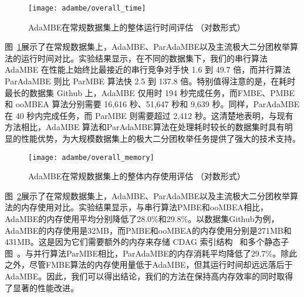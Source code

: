


\begin{figure} [H]
	\centering
  \vspace{0.05in}
	\texttt{[image: adambe/overall\_time]}
	\caption{AdaMBE在常规数据集上的整体运行时间评估 （对数形式）}

	\label{fig:ada_overall_time}
\end{figure}




图~\ref{fig:ada_overall_time}展示了在常规数据集上，AdaMBE、ParAdaMBE以及主流极大二分团枚举算法的运行时间对比。实验结果显示，在不同的数据集下，我们的串行算法 AdaMBE 在性能上始终比最接近的串行竞争对手快 1.6 到 49.7 倍，而并行算法 ParAdaMBE 则比 ParMBE 算法快 2.5 到 137.8 倍。特别值得注意的是，在耗时最长的数据集 Github 上，AdaMBE 仅用时 194 秒完成任务，而FMBE、PMBE 和 ooMBEA 算法分别需要 16,616 秒、51,647 秒和 9,639 秒。同样，ParAdaMBE 在 40 秒内完成任务，而 ParMBE 则需要超过 2,412 秒。这清楚地表明，与现有方法相比，AdaMBE 算法和ParAdaMBE算法在处理耗时较长的数据集时具有明显的性能优势，为大规模数据集上的极大二分团枚举任务提供了强大的技术支持。

\begin{figure} [H]
	\centering
   \vspace{0.05in}
	\texttt{[image: adambe/overall\_memory]}
	\caption{AdaMBE在常规数据集上的整体内存使用评估 （对数形式）}

	\label{fig:ada_overall_memory}
\end{figure}

图~\ref{fig:ada_overall_memory}展示了在常规数据集上，AdaMBE、ParAdaMBE以及主流极大二分团枚举算法的内存使用对比。实验结果显示，与串行算法PMBE和ooMBEA相比，AdaMBE的内存使用平均分别降低了28.0\%和29.8\%。以数据集Github为例，AdaMBE的内存使用是32MB，而PMBE和ooMBEA的内存使用分别是271MB和431MB。这是因为它们需要额外的内存来存储 CDAG 索引结构~\cite{PMBE20} 和多个静态子图~\cite{ooMBE22}。与并行算法ParMBE相比，ParAdaMBE的内存消耗平均降低了29.7\%。除此之外，尽管FMBE算法的内存使用量低于AdaMBE，但其运行时间却远远落后于AdaMBE。因此，我们可以得出结论，我们的方法在保持高内存效率的同时取得了显著的性能改进。

